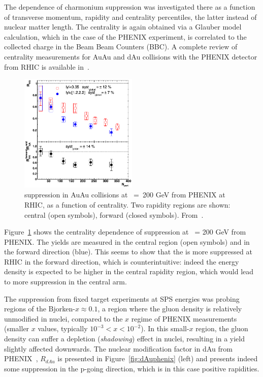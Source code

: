 The dependence of charmonium suppression was investigated there as a
function of transverse momentum, rapidity and centrality percentiles,
the latter instead of nuclear matter length. The centrality is again obtained via a
Glauber model calculation, which in the case of the PHENIX experiment,
is correlated to the collected charge in the Beam Beam
Counters (BBC). A complete review of centrality measurements for AuAu
and dAu collisions with the PHENIX detector from RHIC is available
in~\cite{centralityRHIC}.
\begin{figure}
\begin{center}
  \includegraphics[width=0.5\textwidth]{Chapters/pQuarkonia/Phenix_raa_centrality.png}
  \caption{\Jpsi suppression in AuAu collisions at \snn~=~200 GeV from PHENIX at RHIC, as a function of
    centrality. Two rapidity regions are shown: central (open symbols),
    forward (closed symbols). From~\cite{jpsiphenix}.}
  \label{fig:phenixnpart}
\end{center}
\end{figure}
Figure~\ref{fig:phenixnpart} shows the centrality dependence of \Jpsi
suppression at \snn\ = 200 GeV from PHENIX. The \Jpsi yields are
measured in the central region (open symbols) and in the forward
direction (blue). This seems to show that the \Jpsi is more suppressed
at RHIC in the forward direction, which is counterintuitive: indeed
the energy density is expected to be higher in the central rapidity
region, which would lead to more suppression in the central arm.

The \Jpsi suppression from fixed target experiments at SPS energies was
probing regions of the Bjorken-$x \approx 0.1$, a region where the gluon density is
relatively unmodified in nuclei, compared to the $x$ regime of PHENIX
measurements (smaller $x$ values, typically $10^{-3} < x <
10^{-2}$). In this small-$x$ region, the gluon density can suffer a depletion
(\textit{shadowing}) effect in nuclei, resulting in a \Jpsi yield
slightly affected downwards. The nuclear modification factor in dAu
from PHENIX~\cite{jpsiphenixdAu}, $R_{dAu}$ is presented in
Figure~\ref{fig:dAuphenix} (left) and
presents indeed some suppression in the p-going direction, which is in
this case positive rapidities.




